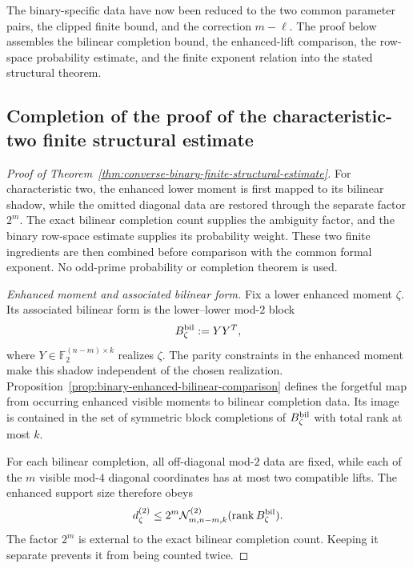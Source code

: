 \documentclass[11pt]{article}
\newcommand{\F}{\mathbb F}
\newcommand{\rank}{\operatorname{rank}}
\newcommand{\1}{\mathbf 1}
\theoremstyle{plain}
\theoremstyle{definition}
\theoremstyle{remark}
\begin{document}
The binary-specific data have now been reduced to the two common parameter
pairs, the clipped finite bound, and the correction $m-\ell$.  The proof below
assembles the bilinear completion bound, the enhanced-lift comparison, the
row-space probability estimate, and the finite exponent relation into the
stated structural theorem.

\subsection{Completion of the proof of the characteristic-two finite structural estimate}

\begin{proof}[Proof of Theorem~\ref{thm:converse-binary-finite-structural-estimate}]
For characteristic two, the enhanced lower moment is first mapped to its
bilinear shadow, while the omitted diagonal data are restored through the
separate factor $2^m$.  The exact bilinear completion count supplies the
ambiguity factor, and the binary row-space estimate supplies its probability
weight.  These two finite ingredients are then combined before comparison with
the common formal exponent.  No odd-prime probability or completion theorem is
used.

\smallskip
\noindent\emph{Enhanced moment and associated bilinear form.}
Fix a lower enhanced moment $\zeta$.  Its associated bilinear form is the lower--lower
mod-$2$ block
\begin{equation}
 B_{\zeta}^{\rm bil}:=YY^T,
 \label{eq:theorem-C-bilinear-shadow}
\end{equation}
where $Y\in\F_2^{(n-m)\times k}$ realizes $\zeta$.  The parity constraints in
the enhanced moment make this shadow independent of the chosen realization.
Proposition~\ref{prop:binary-enhanced-bilinear-comparison} defines the forgetful
map from occurring enhanced visible moments to bilinear completion data.  Its
image is contained in the set of symmetric block completions of
$B_{\zeta}^{\rm bil}$ with total rank at most $k$.

For each bilinear completion, all off-diagonal mod-$2$ data are fixed, while
each of the $m$ visible mod-$4$ diagonal coordinates has at most two compatible
lifts.  The enhanced support size therefore obeys
\begin{equation}
 d_{\zeta}^{(2)}
 \le 2^m\mathcal N_{m,n-m,k}^{(2)}
       (\rank B_{\zeta}^{\rm bil}).
 \label{eq:theorem-C-enhanced-support-completion-bound}
\end{equation}
The factor $2^m$ is external to the exact bilinear completion count.  Keeping
it separate prevents it from being counted twice.


\end{proof}
\end{document}

